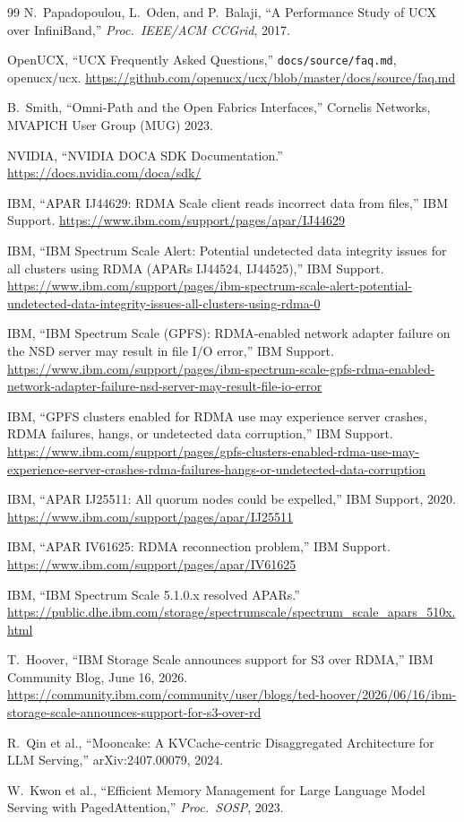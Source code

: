\documentclass[11pt,letterpaper]{article}
\begin{document}
\begin{thebibliography}{99}
N.~Papadopoulou, L.~Oden, and P.~Balaji, ``A Performance Study of UCX over InfiniBand,'' \emph{Proc.\ IEEE/ACM CCGrid}, 2017.

OpenUCX, ``UCX Frequently Asked Questions,'' \texttt{docs/source/faq.md}, openucx/ucx. \url{https://github.com/openucx/ucx/blob/master/docs/source/faq.md}

B.~Smith, ``Omni-Path and the Open Fabrics Interfaces,'' Cornelis Networks, MVAPICH User Group (MUG) 2023.

NVIDIA, ``NVIDIA DOCA SDK Documentation.'' \url{https://docs.nvidia.com/doca/sdk/}

IBM, ``APAR IJ44629: RDMA Scale client reads incorrect data from files,'' IBM Support. \url{https://www.ibm.com/support/pages/apar/IJ44629}

IBM, ``IBM Spectrum Scale Alert: Potential undetected data integrity issues for all clusters using RDMA (APARs IJ44524, IJ44525),'' IBM Support. \url{https://www.ibm.com/support/pages/ibm-spectrum-scale-alert-potential-undetected-data-integrity-issues-all-clusters-using-rdma-0}

IBM, ``IBM Spectrum Scale (GPFS): RDMA-enabled network adapter failure on the NSD server may result in file I/O error,'' IBM Support. \url{https://www.ibm.com/support/pages/ibm-spectrum-scale-gpfs-rdma-enabled-network-adapter-failure-nsd-server-may-result-file-io-error}

IBM, ``GPFS clusters enabled for RDMA use may experience server crashes, RDMA failures, hangs, or undetected data corruption,'' IBM Support. \url{https://www.ibm.com/support/pages/gpfs-clusters-enabled-rdma-use-may-experience-server-crashes-rdma-failures-hangs-or-undetected-data-corruption}

IBM, ``APAR IJ25511: All quorum nodes could be expelled,'' IBM Support, 2020. \url{https://www.ibm.com/support/pages/apar/IJ25511}

IBM, ``APAR IV61625: RDMA reconnection problem,'' IBM Support. \url{https://www.ibm.com/support/pages/apar/IV61625}

IBM, ``IBM Spectrum Scale 5.1.0.x resolved APARs.'' \url{https://public.dhe.ibm.com/storage/spectrumscale/spectrum_scale_apars_510x.html}

T.~Hoover, ``IBM Storage Scale announces support for S3 over RDMA,'' IBM Community Blog, June 16, 2026. \url{https://community.ibm.com/community/user/blogs/ted-hoover/2026/06/16/ibm-storage-scale-announces-support-for-s3-over-rd}

R.~Qin et al., ``Mooncake: A KVCache-centric Disaggregated Architecture for LLM Serving,'' arXiv:2407.00079, 2024.

W.~Kwon et al., ``Efficient Memory Management for Large Language Model Serving with PagedAttention,'' \emph{Proc.\ SOSP}, 2023.

\end{thebibliography}
\end{document}
